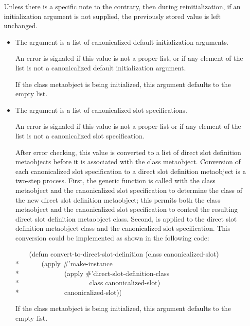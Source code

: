 Unless there is a specific note to the contrary, then during reinitialization,
if an initialization argument is not supplied, the previously stored value is
left unchanged.

\begin{itemize}
\item The  argument is a list of canonicalized default
  initialization arguments.

  An error is signaled if this value is not a proper list, or if any element
  of the list is not a canonicalized default initialization argument.
  
  If the class metaobject is being initialized, this argument defaults to
  the empty list.
\item The  argument is a list of canonicalized slot specifications.
  
  An error is signaled if this value is not a proper list or if any element
  of the list is not a canonicalized slot specification.

  After error checking, this value is converted to a list of direct slot
  definition metaobjects before it is associated with the class
  metaobject. Conversion of each canonicalized slot specification to a direct
  slot definition metaobject is a two-step process. First, the generic function
   is called with the class metaobject and the
  canonicalized slot specification to determine the class of the new direct slot
  definition metaobject; this permits both the class metaobject and the
  canonicalized slot specification to control the resulting direct slot
  definition metaobject class. Second,  is applied to the
  direct slot definition metaobject class and the canonicalized slot
  specification. This conversion could be implemented as shown in the following
  code:

  \begin{lisp}
    ~~~~(defun convert-to-direct-slot-definition (class canonicalized-slot)\\*
    ~~~~~~(apply \#'make-instance\\*
    ~~~~~~~~~~~~ (apply \#'direct-slot-definition-class\\*
    ~~~~~~~~~~~~~~~~~~~~class canonicalized-slot)\\*
    ~~~~~~~~~~~~ canonicalized-slot))
  \end{lisp}

  If the class metaobject is being initialized, this argument defaults to the
  empty list.


\end{itemize}
